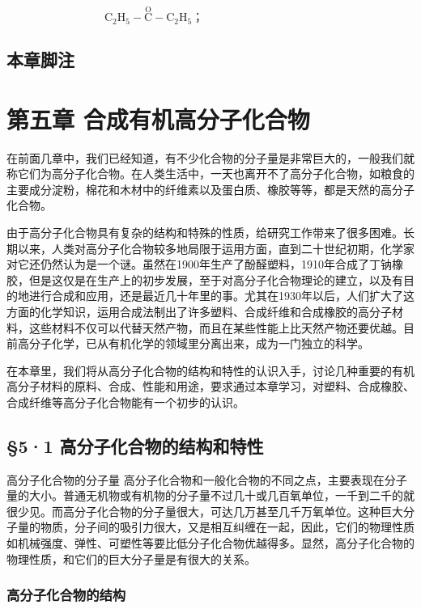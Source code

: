 \[
\mathrm{C} _ {2} \mathrm{H} _ {5} - \stackrel {\mathrm{O}} {\mathrm{C}} - \mathrm{C} _ {2} \mathrm{H} _ {5}\text{；} \quad \text {   } \quad \text {   } \quad \text {   } \quad \text {   } \quad \text {   } \quad \text {   }
\]

\section{本章脚注}

\chapter{第五章 合成有机高分子化合物}

在前面几章中，我们已经知道，有不少化合物的分子量是非常巨大的，一般我们就称它们为高分子化合物。在人类生活中，一天也离开不了高分子化合物，如粮食的主要成分淀粉，棉花和木材中的纤维素以及蛋白质、橡胶等等，都是天然的高分子化合物。

由于高分子化合物具有复杂的结构和特殊的性质，给研究工作带来了很多困难。长期以来，人类对高分子化合物较多地局限于运用方面，直到二十世纪初期，化学家对它还仍然认为是一个谜。虽然在1900年生产了酚醛塑料，1910年合成了丁钠橡胶，但是这仅是在生产上的初步发展，至于对高分子化合物理论的建立，以及有目的地进行合成和应用，还是最近几十年里的事。尤其在1930年以后，人们扩大了这方面的化学知识，运用合成法制出了许多塑料、合成纤维和合成橡胶的高分子材料，这些材料不仅可以代替天然产物，而且在某些性能上比天然产物还要优越。目前高分子化学，已从有机化学的领域里分离出来，成为一门独立的科学。

在本章里，我们将从高分子化合物的结构和特性的认识入手，讨论几种重要的有机高分子材料的原料、合成、性能和用途，要求通过本章学习，对塑料、合成橡胶、合成纤维等高分子化合物能有一个初步的认识。

\section{§5·1 高分子化合物的结构和特性}

高分子化合物的分子量
高分子化合物和一般化合物的不同之点，主要表现在分子量的大小。普通无机物或有机物的分子量不过几十或几百氧单位，一千到二千的就很少见。而高分子化合物的分子量很大，可达几万甚至几千万氧单位。这种巨大分子量的物质，分子间的吸引力很大，又是相互纠缠在一起，因此，它们的物理性质如机械强度、弹性、可塑性等要比低分子化合物优越得多。显然，高分子化合物的物理性质，和它们的巨大分子量是有很大的关系。

\subsection{高分子化合物的结构}

